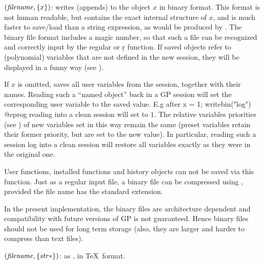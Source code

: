 $(\hbox{\it filename\/},\{x\})$: writes (appends) to
 the object $x$ in binary format. This format is not human
readable, but contains the exact internal structure of $x$, and is much
faster to save/load than a string expression, as would be produced by
. The binary file format includes a magic number, so that such a
file can be recognized and correctly input by the regular  or \b{r}
function. If saved objects refer to (polynomial) variables that are not
defined in the new session, they will be displayed in a funny way (see
).

If $x$ is omitted, saves all user variables from the session, together with
their names. Reading such a ``named object'' back in a GP session will set
the corresponding user variable to the saved value. E.g after
\bprog
x = 1; writebin("log")
@eprog
\noindent reading  into a clean session will set  to $1$.
The relative variables priorities (see ) of new variables
set in this way remain the same (preset variables retain their former
priority, but are set to the new value). In particular, reading such a
session log into a clean session will restore all variables exactly as they
were in the original one.

User functions, installed functions and history objects can not be saved via
this function. Just as a regular input file, a binary file can be compressed
using , provided the file name has the standard 
extension. \label{se:writebin}

In the present implementation, the binary files are architecture dependent
and compatibility with future versions of GP is not guaranteed. Hence
binary files should not be used for long term storage (also, they are
larger and harder to compress than text files).

$(\hbox{\it filename\/},\{\hbox{\it str\/}*\})$: as ,
in \TeX\ format.\label{se:writetex}

\vfill\eject
